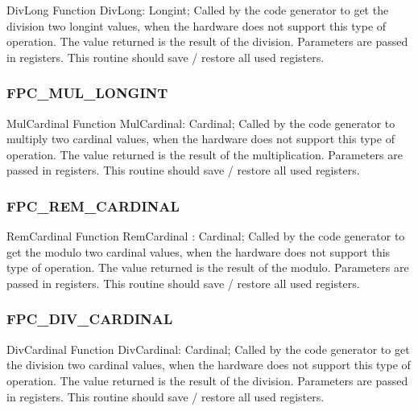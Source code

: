 \documentclass [12pt]{article}
\begin{document}
\begin{function}{DivLong}
\Declaration
Function DivLong: Longint;
\Description 
Called by the code generator to get the division two longint values, when
the hardware does not support this type of operation. The value returned is
the result of the division.
\Parameters 
Parameters are passed in registers. 
\Notes 
This routine should save / restore all used registers. 
\end{function}

\subsubsection{FPC{\_}MUL{\_}LONGINT}
\label{subsubsec:mylabel106}

\begin{function}{MulCardinal}
\Declaration
Function MulCardinal: Cardinal;
\Description
Called by the code generator to multiply two cardinal values, when the
hardware does not support this type of operation. The value returned is the
result of the multiplication. 
\Parameters
Parameters are passed in registers. 
\Notes
This routine should save / restore all used registers. 
\end{function}

\subsubsection{FPC{\_}REM{\_}CARDINAL}
\label{subsubsec:mylabel107}

\begin{function}{RemCardinal}
\Declaration
Function RemCardinal : Cardinal;
\Description
Called by the code generator to get the modulo two cardinal values, when the
hardware does not support this type of operation. The value returned is the
result of the modulo.
\Parameters
Parameters are passed in registers. 
\Notes 
This routine should save / restore all used registers. 
\end{function}

\subsubsection{FPC{\_}DIV{\_}CARDINAL}
\label{subsubsec:mylabel108}

\begin{function}{DivCardinal}
\Declaration
Function DivCardinal: Cardinal;
\Description
Called by the code generator to get the division two cardinal values, when
the hardware does not support this type of operation. The value returned is
the result of the division. 
\Parameters
Parameters are passed in registers. 
\Notes
This routine should save / restore all used registers. 
\end{function}
\end{document}
